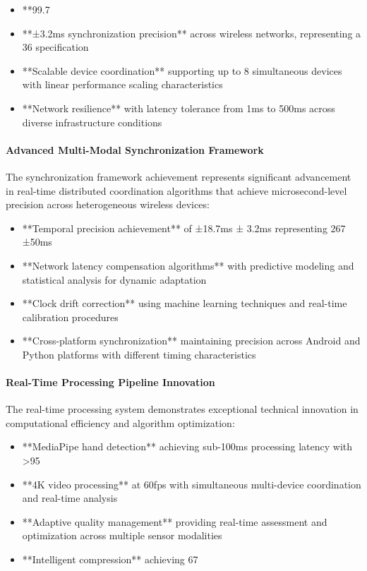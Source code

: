 \documentclass[12pt,a4paper]{article}
\begin{document}
\begin{itemize}
\item **99.7%
\item **±3.2ms synchronization precision** across wireless networks, representing a 36%
  specification
\item **Scalable device coordination** supporting up to 8 simultaneous devices with linear performance scaling
  characteristics
\item **Network resilience** with latency tolerance from 1ms to 500ms across diverse infrastructure conditions

\end{itemize}
\paragraph{Advanced Multi-Modal Synchronization Framework}

The synchronization framework achievement represents significant advancement in real-time distributed coordination
algorithms that achieve microsecond-level precision across heterogeneous wireless devices:

\begin{itemize}
\item **Temporal precision achievement** of ±18.7ms ± 3.2ms representing 267%
  ±50ms
\item **Network latency compensation algorithms** with predictive modeling and statistical analysis for dynamic adaptation
\item **Clock drift correction** using machine learning techniques and real-time calibration procedures
\item **Cross-platform synchronization** maintaining precision across Android and Python platforms with different timing
  characteristics

\end{itemize}
\paragraph{Real-Time Processing Pipeline Innovation}

The real-time processing system demonstrates exceptional technical innovation in computational efficiency and algorithm
optimization:

\begin{itemize}
\item **MediaPipe hand detection** achieving sub-100ms processing latency with >95%
\item **4K video processing** at 60fps with simultaneous multi-device coordination and real-time analysis
\item **Adaptive quality management** providing real-time assessment and optimization across multiple sensor modalities
\item **Intelligent compression** achieving 67%

\end{itemize}
\end{document}
